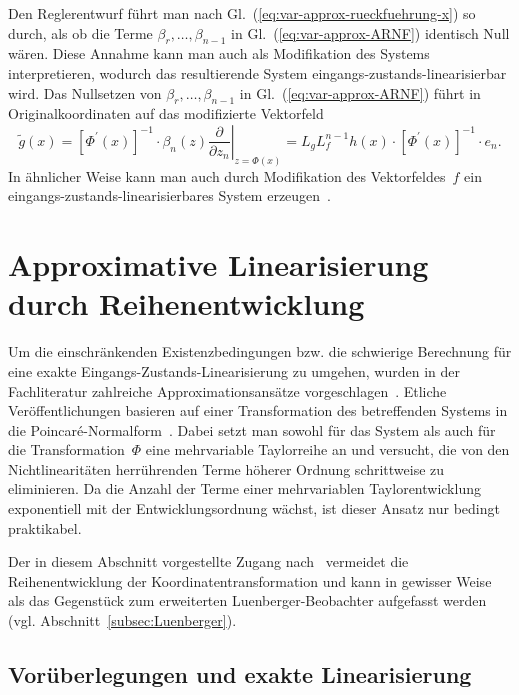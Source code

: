 \begin{remark}
Den Reglerentwurf führt man nach Gl.~(\ref{eq:var-approx-rueckfuehrung-x})
so durch, als ob die Terme $\beta_{r},\ldots,\beta_{n-1}$ in Gl.~(\ref{eq:var-approx-ARNF})
identisch Null wären. Diese Annahme kann man auch als Modifikation
des Systems interpretieren, wodurch das resultierende System eingangs-zustands-linearisierbar
wird. Das Nullsetzen von $\beta_{r},\ldots,\beta_{n-1}$ in Gl.~(\ref{eq:var-approx-ARNF})
führt in Originalkoordinaten auf das modifizierte Vektorfeld 
\[
\tilde{g}(x)=\left[\Phi^{\prime}(x)\right]^{-1}\cdot\left.\beta_{n}(z)\frac{\partial}{\partial z_{n}}\right|_{z=\Phi(x)}=L_{g}L_{f}^{n-1}h(x)\cdot\left[\Phi^{\prime}(x)\right]^{-1}\cdot e_{n}.
\]
In ähnlicher Weise kann man auch durch Modifikation des Vektorfeldes~$f$
ein eingangs-zustands-linearisierbares System erzeugen~\cite{hauser92}.
\end{remark}

\section{Approximative Linearisierung durch Reihenentwicklung\label{sec:Approximative-Linearisierung-Reihenentwicklung}}

Um die einschränkenden Existenzbedingungen bzw. die schwierige Berechnung
für eine exakte Eingangs-Zustands-Linearisierung zu umgehen, wurden
in der Fachliteratur zahlreiche Approximationsansätze
vorgeschlagen~\cite{reboulet84,baumann86,guardabassi2001}. Etliche
Veröffentlichungen basieren auf einer Transformation des betreffenden
Systems in die Poincaré-Normalform~\cite{krener84,krener90,krener91poincare,devanathan2001,devanathan2004}.
Dabei setzt man sowohl für das System als auch für die Transformation~$\Phi$
eine mehrvariable Taylor\-reihe an und versucht, die von den Nichtlinearitäten
herrührenden Terme höherer Ordnung schrittweise zu eliminieren. Da
die Anzahl der Terme einer mehrvariablen Taylorentwicklung exponentiell
mit der Entwicklungsordnung wächst, ist dieser Ansatz nur bedingt
praktikabel. 

Der in diesem Abschnitt vorgestellte Zugang nach~\cite{roebenack2012pamm,roebenack2013ecc,franke2015buch}
vermeidet die Reihenentwicklung der Koordinatentransformation und
kann in gewisser Weise als das Gegenstück zum erweiterten Luenberger-Beobachter
aufgefasst werden (vgl. Abschnitt~\ref{subsec:Luenberger}).

\subsection{Vorüberlegungen und exakte Linearisierung\label{subsec:Approx-exakt}}


